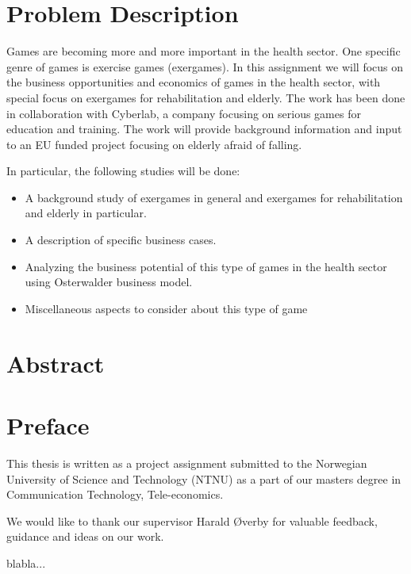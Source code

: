 \documentclass[b5paper,twoside,openright,11pt]{report}
\begin{document}
\chapter*{Problem Description} 
Games are becoming more and more important in the health sector. One specific genre of games is exercise games (exergames). In this assignment we will focus on the business opportunities and economics of games in the health sector, with special focus on exergames for rehabilitation and elderly. The work has been done in collaboration with Cyberlab, a company focusing on serious games for education and training. The work will provide background information and input to an EU funded project focusing on elderly afraid of falling.

In particular, the following studies will be done: 
\begin{itemize}
\renewcommand{\labelitemi}{$\bullet$}
\item A background study of exergames in general and exergames for rehabilitation and elderly in particular.
\item	A description of specific business cases.
\item	Analyzing the business potential of this type of games in the health sector using Osterwalder business model.
\item	Miscellaneous aspects to consider about this type of game
\end{itemize}
\cleardoublepage
\chapter*{Abstract}
\cleardoublepage
\chapter*{Preface}
This thesis is written as a project assignment submitted to the Norwegian University of Science and Technology (NTNU) as a part of our masters degree in Communication Technology, Tele-economics.  

We would like to thank our supervisor Harald Øverby for valuable feedback, guidance and ideas on our work.     

blabla...
\cleardoublepage
{}
\tableofcontents
\cleardoublepage

\cleardoublepage
\listoffigures
\cleardoublepage
\listoftables
\cleardoublepage
{}

\cleardoublepage

\cleardoublepage

\cleardoublepage

\cleardoublepage

\cleardoublepage

\cleardoublepage

\cleardoublepage

\cleardoublepage

\cleardoublepage


\cleardoublepage

\end{document}
